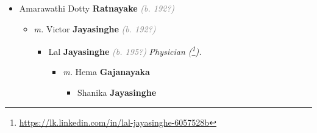 \documentclass[10pt, openany]{book}
\begin{document}
\begin{itemize}
{\begin{itemize}
{\begin{itemize}
{\begin{itemize}
{\begin{itemize}
{\begin{itemize}
{ }
\item{Haresh \textbf{Siriwardena} \textcolor{slorange}{\textit{}}
 }
\item{Niluka \textbf{Siriwardena} \textcolor{slorange}{\textit{}}
 }
\end{itemize}}
\end{itemize}
 }
\item{Anoja \textbf{Wijethilake} \textcolor{gray}{\textit{(b. 195?)}}
\begin{itemize}
\item{\textit{m.} Piyasiri \textbf{Wijeratne} \textcolor{slorange}{\textit{}}   \label{couple:00000997:00001017} \begin{itemize}
\item{Thivanka \textbf{Wijeratne} \textcolor{slorange}{\textit{}}
 }
\item{Rukshan \textbf{Wijeratne} \textcolor{slorange}{\textit{}}
 }
\item{Lakshan Viranga \textbf{Wijeratne} \textcolor{slorange}{\textit{}}
  }
\end{itemize}}
\end{itemize}
 }
\end{itemize}}
\end{itemize}
  }
\item{Amarawathi Dotty \textbf{Ratnayake} \textcolor{gray}{\textit{(b. 192?)}}
\begin{itemize}
\item{\textit{m.} Victor \textbf{Jayasinghe} \textcolor{gray}{\textit{(b. 192?)}}   \label{couple:00000345:00000643} \begin{itemize}
\item{Lal \textbf{Jayasinghe} \textcolor{gray}{\textit{(b. 195?)}} \textcolor{slmaroon}{\textit{Physician (\footnote{\url{https://lk.linkedin.com/in/lal-jayasinghe-6057528b}}).}}
\begin{itemize}
\item{\textit{m.} Hema \textbf{Gajanayaka} \textcolor{slorange}{\textit{}}   \label{couple:00000201:00000331} \begin{itemize}
\item{Shanika \textbf{Jayasinghe} \textcolor{slorange}{\textit{}}
 }

\end{itemize}}
\end{itemize}}
\end{itemize}}
\end{itemize}}
\end{itemize}}
\end{itemize}
\end{document}
